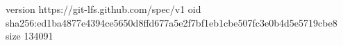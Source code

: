 version https://git-lfs.github.com/spec/v1
oid sha256:ed1ba4877e4394ce5650d8ffd677a5e2f7bf1eb1cbe507fc3e0b4d5e5719cbe8
size 134091
